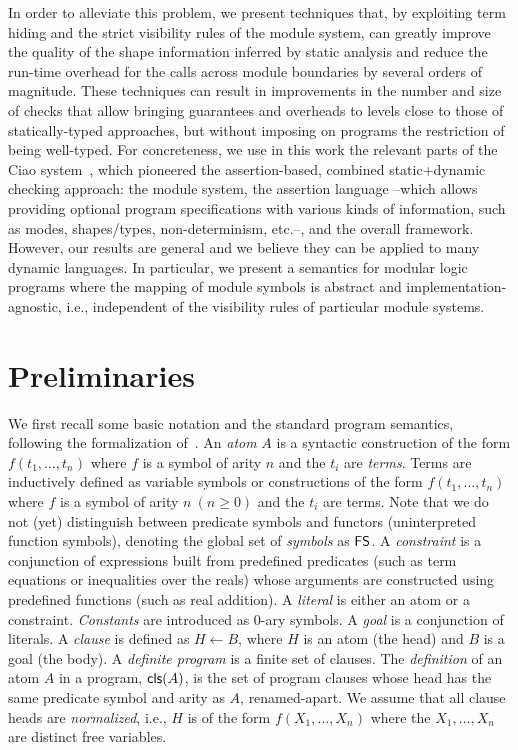 \documentclass{llncs}
\begin{document}
In order to alleviate this problem, we present techniques that, by
exploiting term hiding and the strict visibility rules of the
module system, can greatly improve the quality of the shape
information inferred by static analysis
%
and reduce the run-time overhead for the calls across module
boundaries by several orders of magnitude.
%
These techniques can result in improvements in the number and size of
checks that allow bringing guarantees and overheads to levels
close
to those of statically-typed approaches, but without imposing on
programs the restriction of being well-typed.
%
For concreteness, we use in this work the relevant parts of the Ciao
system~\cite{hermenegildo11:ciao-design-tplp-shorter},
which pioneered
the assertion-based, combined static+dynamic checking approach:
the module system,
the assertion language --which allows providing optional program
specifications with various kinds of information, such as modes,
shapes/types, non-determinism, etc.--,
and the overall framework.
%
However, our results are general and we believe they can be applied to
many dynamic languages.  In particular, we present a semantics for
modular logic programs where the mapping of module symbols is abstract
and implementation-agnostic, i.e., independent of the visibility rules
of particular module systems.



\section{Preliminaries}

We first recall
some basic notation and the standard program semantics, following the
formalization of~\cite{optchk-ppdp2016-shorter}.
%
An \emph{atom} $A$ is a syntactic construction of the form
$f(t_1,\ldots,t_n)$ where $f$ is a symbol of arity $n$ and the $t_i$
are \emph{terms}.
%
Terms are inductively defined as variable symbols or
constructions of the form $f(t_1,\ldots,t_n)$ where $f$ is a symbol of
arity $n~(n \geq 0)$ and the $t_i$ are terms.
%
Note that we do not (yet) distinguish between predicate symbols and
functors (uninterpreted function symbols), denoting the global set of
\emph{symbols} as $\textsf{FS}$.
%
A \emph{constraint} is a conjunction of expressions built
from predefined predicates (such as term equations or inequalities
over the reals) whose arguments are constructed using predefined
functions (such as real addition).
%
A \emph{literal} is either an atom or a constraint.
%
\emph{Constants} are introduced as 0-ary symbols.
%
A \emph{goal} is a conjunction of literals.
%
A \emph{clause} is defined as $H \leftarrow B$, where $H$ is an atom
(the head)
and $B$ is a goal (the body).
%
A \emph{definite program} is a finite set of clauses.
%
The \emph{definition} of an atom $A$ in a program, $\mathsf{cls}(A)$, is the
set of program clauses
whose head has
the same predicate symbol and arity as $A$, renamed-apart.
%
We assume that all clause heads are \emph{normalized}, i.e., $H$ is of
the form $f(X_1,\ldots,X_n)$ where the $X_1,\ldots,X_n$ are distinct
free variables.
\end{document}
